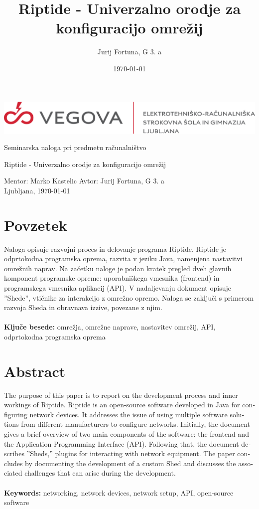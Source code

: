 \documentclass[12pt]{article}
\title{Riptide - Univerzalno orodje za konfiguracijo omrežij}
\author{Jurij Fortuna, G 3. a}
\date{\MMYYYYdate\today}
\begin{document}
\begin{center}
	\thispagestyle{empty}
	\includegraphics[scale=1]{slike/vegova.png}

	\vspace{\fill}
	Seminarska naloga pri predmetu računalništvo

	\Huge{Riptide - Univerzalno orodje za konfiguracijo omrežij}

	\normalsize
	\vspace{\fill}

	Mentor: Marko Kastelic \hfill Avtor: Jurij Fortuna, G 3. a\\
	\null
	Ljubljana, \MMYYYYdate\today
\end{center}
\newpage

\section*{Povzetek}
Naloga opisuje razvojni proces in delovanje programa Riptide. Riptide je
odprtokodna programska oprema, razvita v jeziku Java, namenjena
nastavitvi omrežnih naprav. Na začetku naloge je podan kratek pregled dveh
glavnih komponent programske opreme: uporabniškega vmesnika (frontend) in
programskega vmesnika aplikacij (API). V nadaljevanju dokument opisuje
''Shede'', vtičnike za interakcijo z omrežno opremo. Naloga se
zaključi s primerom razvoja Sheda in obravnava izzive, povezane z njim.
\\\\
\textbf{Ključe besede:} omrežja, omrežne naprave, nastavitev omrežij, API,
odprtokodna programska oprema
\\
\section*{Abstract}
\foreignlanguage{english}{
	The purpose of this paper is to report on the development process and
	inner workings of Riptide. Riptide is an open-source software developed
	in Java for configuring network devices. It addresses the issue of
	using multiple software solutions from different manufacturers to
	configure networks. Initially, the document gives a brief overview of
	two main components of the software: the frontend and the Application
	Programming Interface (API). Following that, the document describes
	''Sheds,'' plugins for interacting with network equipment. The paper
	concludes by documenting the development of a custom Shed and discusses
	the associated challenges that can arise during the development.
	\\\\
	\textbf{Keywords:} networking, network devices, network setup, API,
	open-source software
}
\newpage
\end{document}
